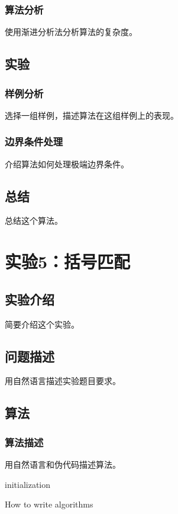 \documentclass{ctexrep}
\begin{document}
\subsection{算法分析}
使用渐进分析法分析算法的复杂度。

\section{实验}
\subsection{样例分析}
选择一组样例，描述算法在这组样例上的表现。
\subsection{边界条件处理}
介绍算法如何处理极端边界条件。

\section{总结}
总结这个算法。

\chapter{实验5：括号匹配}
\section{实验介绍}
简要介绍这个实验。

\section{问题描述}
用自然语言描述实验题目要求。

\section{算法}
\subsection{算法描述}
用自然语言和伪代码描述算法。
\begin{algorithm}
\SetAlgoLined
{}
 initialization\;
 \caption{How to write algorithms}
\end{algorithm}
\end{document}
